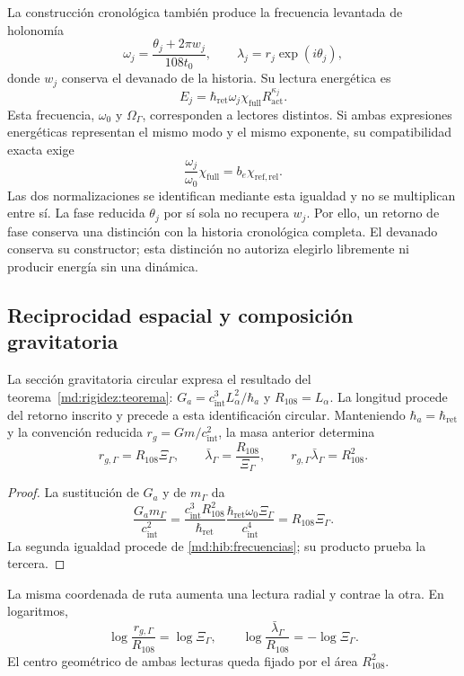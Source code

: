 La construcción cronológica también produce la frecuencia levantada de
holonomía
\begin{equation}
 \omega_j=\frac{\theta_j+2\pi w_j}{108t_0},\qquad
 \lambda_j=r_j\exp(i\theta_j),
 \label{md:hib:frecuencia-levantada}
\end{equation}
donde $w_j$ conserva el devanado de la historia. Su lectura energética es
\begin{equation}
 E_j=\hbar_{\mathrm{ret}}\omega_j
 \chi_{\mathrm{full}}R_{\mathrm{act}}^{\kappa_j}.
 \label{md:hib:energia-levantada}
\end{equation}
Esta frecuencia, $\omega_0$ y $\Omega_\Gamma$, corresponden a lectores
distintos. Si ambas expresiones energéticas representan el mismo modo y
el mismo exponente, su compatibilidad exacta exige
\begin{equation}
 \frac{\omega_j}{\omega_0}\chi_{\mathrm{full}}
 =b_e\chi_{\mathrm{ref,rel}}.
 \label{md:hib:compatibilidad-normalizaciones}
\end{equation}
Las dos normalizaciones se identifican mediante esta igualdad y no se
multiplican entre sí. La fase reducida $\theta_j$ por sí sola no recupera
$w_j$. Por ello, un retorno de fase conserva una distinción con la historia
cronológica completa. El devanado conserva su constructor; esta distinción
no autoriza elegirlo libremente ni producir energía sin una dinámica.

\subsection{Reciprocidad espacial y composición gravitatoria}
\label{md:hib:gravedad}

La sección gravitatoria circular expresa el resultado del
teorema~\ref{md:rigidez:teorema}:
$G_a=c_{\mathrm{int}}^3L_\alpha^2/\hbar_a$ y $R_{108}=L_\alpha$.
La longitud procede del retorno inscrito y precede a esta
identificación circular. Manteniendo
$\hbar_a=\hbar_{\mathrm{ret}}$ y la convención reducida
$r_g=Gm/c_{\mathrm{int}}^2$, la masa anterior determina
\begin{equation}
 \boxed{r_{g,\Gamma}=R_{108}\Xi_\Gamma,\qquad
 \bar\lambda_\Gamma=\frac{R_{108}}{\Xi_\Gamma},\qquad
 r_{g,\Gamma}\bar\lambda_\Gamma=R_{108}^2.}
 \label{md:hib:reciprocidad-radial}
\end{equation}
\begin{proof}
La sustitución de $G_a$ y de $m_\Gamma$ da
\[
 \frac{G_am_\Gamma}{c_{\mathrm{int}}^2}
 =\frac{c_{\mathrm{int}}^3R_{108}^2}{\hbar_{\mathrm{ret}}}
 \frac{\hbar_{\mathrm{ret}}\omega_0\Xi_\Gamma}
 {c_{\mathrm{int}}^4}
 =R_{108}\Xi_\Gamma.
\]
La segunda igualdad procede de \eqref{md:hib:frecuencias}; su producto
prueba la tercera.
\end{proof}
La misma coordenada de ruta aumenta una lectura radial y contrae la otra.
En logaritmos,
\begin{equation}
 \log\frac{r_{g,\Gamma}}{R_{108}}=\log\Xi_\Gamma,
 \qquad
 \log\frac{\bar\lambda_\Gamma}{R_{108}}=-\log\Xi_\Gamma.
 \label{md:hib:radios-logaritmicos}
\end{equation}
El centro geométrico de ambas lecturas queda fijado por el área $R_{108}^2$.

